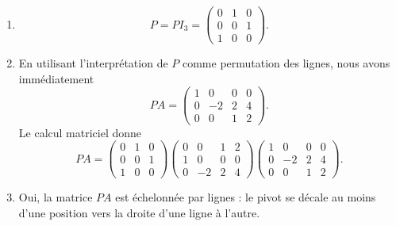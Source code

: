 {\begin{enumerate}
		La matrice $A$ n'est pas échelonnée en lignes car le pivot de la première ligne est après le pivot de la deuxième ligne.
		\item
			\[ P = PI_3 = \begin{pmatrix} 0 & 1 & 0 \\ 0 & 0 & 1 \\ 1 & 0 & 0 \end{pmatrix}. \]
		\item
		En utilisant l'interprétation de $P$ comme permutation des lignes, nous avons immédiatement
			\[ PA = \begin{pmatrix} 1 & 0 & 0 & 0 \\ 0 & -2 & 2 & 4 \\ 0 & 0 & 1 & 2 \end{pmatrix}. \]
		Le calcul matriciel donne 
			\[ PA = \begin{pmatrix} 0 & 1 & 0 \\ 0 & 0 & 1 \\ 1 & 0 & 0 \end{pmatrix} \begin{pmatrix} 0 & 0& 1 & 2 \\ 1 & 0 & 0 & 0 \\ 0 & -2 & 2 & 4 \end{pmatrix} \begin{pmatrix} 1 & 0 & 0 & 0 \\ 0 & -2 & 2 & 4 \\ 0 & 0 & 1 & 2 \end{pmatrix}. \]
		\item
		Oui, la matrice $PA$ est échelonnée par lignes : le pivot se décale au moins d'une position vers la droite d'une ligne à l'autre.
	\end{enumerate}
}

